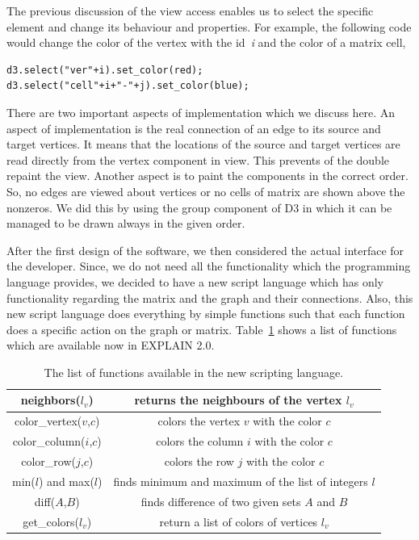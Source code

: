 \documentclass[12pt, oneside]{book}
\begin{document}
The previous discussion of the view access enables us to select the 
specific element and change its behaviour and properties. For example, the following 
code would change the color of the vertex with the id~\textit{i} and the color
of a matrix cell,
\begin{lstlisting}
d3.select("ver"+i).set_color(red);
d3.select("cell"+i+"-"+j).set_color(blue);
\end{lstlisting}

There are two important aspects of implementation which we discuss here. 
An aspect of implementation is the real connection of an edge to its
source and target vertices. It means that the locations of the source and target
vertices are read directly from the vertex component in view. This prevents 
of the double repaint the view.
Another aspect is to paint the components in the correct order. So, no edges
are viewed about vertices or no cells of matrix are shown above the nonzeros. 
We did this by using the group component of D3 in which it can be managed
to be drawn always in the given order.

After the first design of the software, we then considered the actual interface
for the developer. Since, we do not need all the functionality which the 
programming language provides, we decided to have a new script language which
has only functionality regarding the matrix and the graph and their
connections. Also, this new script language does everything by simple functions
such that each function does a specific action on the graph or matrix.
Table~\ref{command-table} shows a list of functions which are available
now in EXPLAIN 2.0.
\begin{table}
  \begin{tabular}{ | c | c |}
    \hline
    neighbors($l_v$) & returns the neighbours of the vertex $l_v$  \\ \hline
    color\_vertex($v$,$c$) & colors the vertex $v$ with the color $c$  \\\hline
    color\_column($i$,$c$) & colors the column $i$ with the color $c$  \\\hline
    color\_row($j$,$c$)    & colors the row $j$ with the color $c$  \\\hline
    min($l$) and max($l$) & finds minimum and maximum of the list of integers $l$ \\\hline
    diff($A$,$B$) & finds difference of two given sets $A$ and $B$ \\\hline
    get\_colors($l_v$) & return a list of colors of vertices $l_v$ \\\hline
\end{tabular}
\caption{The list of functions available in the new scripting language.}
\label{command-table}  
\end{table}
\end{document}
